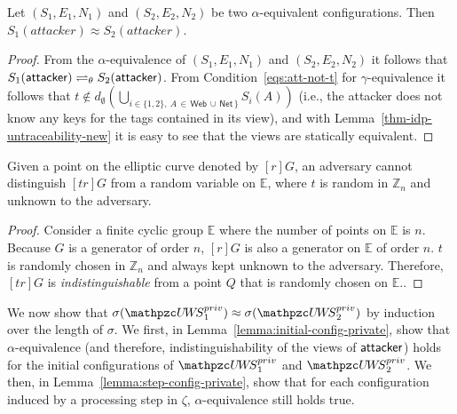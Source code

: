   \begin{lemma}
    Let $(S_1,E_1,N_1)$ and $(S_2,E_2,N_2)$ be two 
    $\alpha$-equivalent configurations. 
    Then $S_1(attacker)\approx S_2(attacker)$.
  \end{lemma}
  \begin{proof}
    From the $\alpha$-equivalence of $(S_1,E_1,N_1)$ and 
    $(S_2,E_2,N_2)$ it follows that $S_1(\mathsf{attacker}) 
    \rightleftharpoons_{\theta} S_2(\mathsf{attacker})$.
    From Condition~\ref{eqs:att-not-t} for $\gamma$-equivalence 
    it follows that
    $t \not\in d_\emptyset(\bigcup_{i \in \{1,2\},\ A\, \in\, 
    \mathsf{Web}\, \cup \, \mathsf{Net}\, \}}S_i(A))$
    (i.e., the attacker does not know any keys for the tags 
    contained in its view), and with Lemma~\ref{thm-idp-untraceability-new} it is easy to see 
    that the views are statically equivalent.
  \end{proof}

  \begin{lemma}\label{thm-idp-untraceability-new}
    Given a point on the elliptic curve denoted by $[r]G$, 
    an adversary cannot distinguish $[tr]G$ from a random variable on $\mathbb{E}$, 
    where $t$ is random in $\mathbb{Z}_n$ and unknown to the adversary.
  \end{lemma}
  \begin{proof}
    Consider a finite cyclic group $\mathbb{E}$ where the number of points on $\mathbb{E}$ is $n$. 
    Because $G$ is a generator of order $n$, $[r]G$ is also a generator on $\mathbb{E}$ of order $n$. 
    $t$ is randomly chosen in $\mathbb{Z}_n$ and always kept unknown to the adversary. 
    Therefore, $[tr]G$ is \emph{indistinguishable} from a point $Q$ that is randomly chosen on $\mathbb{E}$.\cite{oprf-proved,voprf-proved}.
  \end{proof}
  
  We now show that $\sigma(\uppressoprivwebsystem_1) \approx
  \sigma(\uppressoprivwebsystem_2)$ by induction over the length 
  of $\sigma$. We first, in Lemma~\ref{lemma:initial-config-private}, 
  show that $\alpha$-equivalence (and therefore, indistinguishability 
  of the views of $\mathsf{attacker}$) holds for the initial 
  configurations of $\uppressoprivwebsystem_1$ and 
  $\uppressoprivwebsystem_2$. We then, in 
  Lemma~\ref{lemma:step-config-private}, show that for each 
  configuration induced by a processing step in $\zeta$,
  $\alpha$-equivalence still holds true.
  
